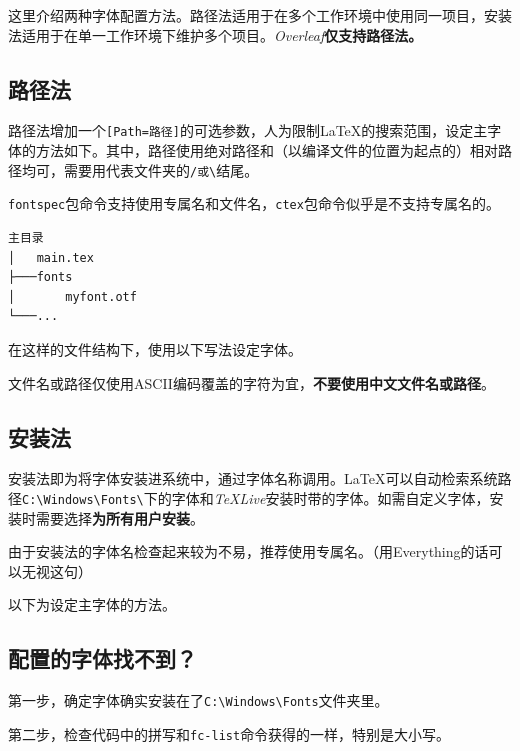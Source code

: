 \documentclass[10pt,openany]{book}
\begin{document}
\begin{sloppypar}
    这里介绍两种字体配置方法。路径法适用于在多个工作环境中使用同一项目，安装法适用于在单一工作环境下维护多个项目。\emph{Overleaf}\textbf{仅支持路径法。}

    \subsection{路径法}

    路径法增加一个\texttt{{[}Path=路径{]}}的可选参数，人为限制{\LaTeX}的搜索范围，设定主字体的方法如下。其中，路径使用绝对路径和（以编译文件的位置为起点的）相对路径均可，需要用代表文件夹的\texttt{/或\textbackslash{}}结尾。

    \texttt{fontspec}包命令支持使用专属名和文件名，\texttt{ctex}包命令似乎是不支持专属名的。

    \begin{lstlisting}[title=文件结构示例]
主目录
│   main.tex
├───fonts
│       myfont.otf
└───...
\end{lstlisting}

    在这样的文件结构下，使用以下写法设定字体。

    

    文件名或路径仅使用ASCII编码覆盖的字符为宜，\textbf{不要使用中文文件名或路径}。

    \subsection{安装法}

    安装法即为将字体安装进系统中，通过字体名称调用。{\LaTeX}可以自动检索系统路径\texttt{C:\textbackslash{}Windows\textbackslash{}Fonts\textbackslash{}}下的字体和\emph{TeXLive}安装时带的字体。如需自定义字体，安装时需要选择\textbf{为所有用户安装}。

    由于安装法的字体名检查起来较为不易，推荐使用专属名。（用Everything的话可以无视这句）

    以下为设定主字体的方法。

    

    \subsection{配置的字体找不到？}

    第一步，确定字体确实安装在了\texttt{C:\textbackslash{}Windows\textbackslash{}Fonts}文件夹里。

    第二步，检查代码中的拼写和\texttt{fc-list}命令获得的一样，特别是大小写。


\end{sloppypar}
\end{document}
